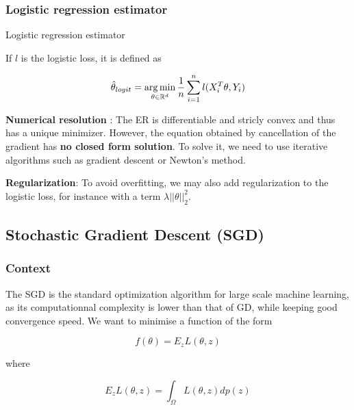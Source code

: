 \documentclass[
10pt, %
a4paper, %
oneside, %
headinclude,footinclude, %
BCOR5mm, %
]{scrartcl}
\begin{document}
\subsubsection{\large\color{Periwinkle}Logistic regression estimator}

\begin{definition}{Logistic regression estimator}
    \label{def:logicest}

    If $l$ is the logistic loss, it is defined as

    \begin{equation*}
	\hat{\theta}_{logit} = \operatorname*{arg\,min}_{\theta\in \mathbb{R}^d} \frac{1}{n} \sum^{n}_{i=1} l(X_i^T\theta, Y_i) 
    \end{equation*}
\end{definition}

\textbf{{Numerical resolution}} : The ER is differentiable and stricly convex and thus has a unique minimizer. However, the equation obtained by cancellation of the gradient has \textbf{{no closed form solution}}. To solve it, we need to use iterative algorithms such as gradient descent or Newton's method.

\textbf{{Regularization}}: To avoid overfitting, we may also add regularization to the logistic loss, for instance with a term $ \lambda || \theta||_2^2$.

\subsection{\large\color{MidnightBlue}Stochastic Gradient Descent (SGD)}

\subsubsection{\large\color{Periwinkle}Context}

The SGD is the standard optimization algorithm for large scale machine learning, as its computationnal complexity is lower than that of GD, while keeping good convergence speed. We want to minimise a function of the form

\begin{equation*}
    f(\theta)=  E_z L(\theta, z)
\end{equation*}

where 

\begin{equation*}
    E_z L(\theta, z) = \int_{\Omega} L(\theta, z)dp(z)
\end{equation*}
\end{document}
